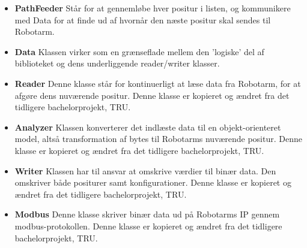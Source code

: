{\begin{itemize}
\item{\textbf{PathFeeder}} \newline
Står for at gennemløbe hver positur i listen, og kommunikere med Data for at finde ud af hvornår den næste positur skal sendes til Robotarm.

\item{\textbf{Data}}\newline
Klassen virker som en grænseflade mellem den 'logiske' del af biblioteket og dens underliggende reader/writer klasser.

\item{\textbf{Reader}}\newline
Denne klasse står for kontinuerligt at læse data fra Robotarm, for at afgøre dens nuværende positur. Denne klasse er kopieret og ændret fra det tidligere bachelorprojekt, TRU.

\item{\textbf{Analyzer}} \newline
Klassen konverterer det indlæste data til en objekt-orienteret model, altså transformation af bytes til Robotarms nuværende positur. Denne klasse er kopieret og ændret fra det tidligere bachelorprojekt, TRU.

\item{\textbf{Writer}}\newline
Klassen har til ansvar at omskrive værdier til binær data. Den omskriver både positurer samt konfigurationer. Denne klasse er kopieret og ændret fra det tidligere bachelorprojekt, TRU.

\item{\textbf{Modbus}}\newline
Denne klasse skriver binær data ud på Robotarms IP gennem modbus-protokollen. Denne klasse er kopieret og ændret fra det tidligere bachelorprojekt, TRU.
\end{itemize}

}
